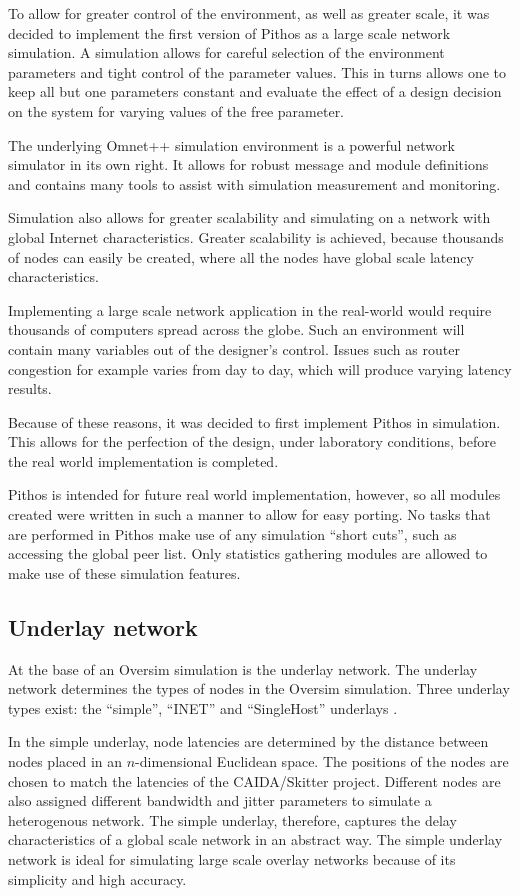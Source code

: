 To allow for greater control of the environment, as well as greater scale, it was decided to implement the first version of Pithos as a large scale network simulation. A simulation allows for careful selection of the environment parameters and tight control of the parameter values. This in turns allows one to keep all but one parameters constant and evaluate the effect of a design decision on the system for varying values of the free parameter.

The underlying Omnet++ simulation environment is a powerful network simulator in its own right. It allows for robust message and module definitions and contains many tools to assist with simulation measurement and monitoring.

Simulation also allows for greater scalability and simulating on a network with global Internet characteristics. Greater scalability is achieved, because thousands of nodes can easily be created, where all the nodes have global scale latency characteristics.

Implementing a large scale network application in the real-world would require thousands of computers spread across the globe. Such an environment will contain many variables out of the designer's control. Issues such as router congestion for example varies from day to day, which will produce varying latency results.

Because of these reasons, it was decided to first implement Pithos in simulation. This allows for the perfection of the design, under laboratory conditions, before the real world implementation is completed.

Pithos is intended for future real world implementation, however, so all modules created were written in such a manner to allow for easy porting. No tasks that are performed in Pithos make use of any simulation ``short cuts'', such as accessing the global peer list. Only statistics gathering modules are allowed to make use of these simulation features.


    \subsection{Underlay network}
    
At the base of an Oversim simulation is the underlay network. The underlay network determines the types of nodes in the Oversim simulation. Three underlay types exist: the ``simple'', ``INET'' and ``SingleHost'' underlays \cite{oversim_applications}.

In the simple underlay, node latencies are determined by the distance between nodes placed in an $n$-dimensional Euclidean space. The positions of the nodes are chosen to match the latencies of the CAIDA/Skitter project. Different nodes are also assigned different bandwidth and jitter parameters to simulate a heterogenous network. The simple underlay, therefore, captures the delay characteristics of a global scale network in an abstract way. The simple underlay network is ideal for simulating large scale overlay networks because of its simplicity and high accuracy.


